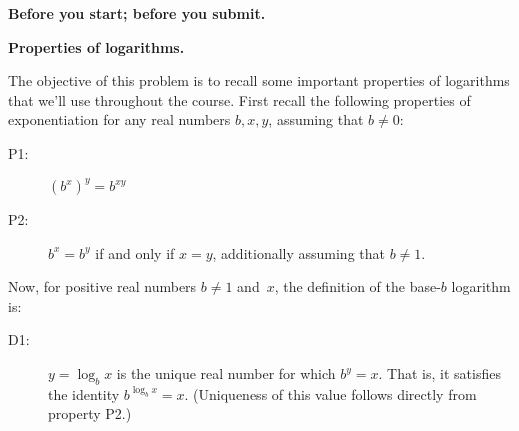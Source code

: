 \documentclass[11pt,addpoints]{exam}
\begin{document}
\hwpreface

\pointsinmargin
{}
\marginpointname{ \points}
\marginbonuspointname{ \bonuspoints}

\begin{questions}

  \addtocounter{question}{-1}
  \question[0] \textbf{Before you start; before you submit.}
  

  \question \textbf{Properties of logarithms.}
  
  The objective of this problem is to recall some important properties of logarithms that we'll use throughout the course.
  First recall the following properties of exponentiation for any real numbers $b, x, y$, assuming that $b \neq 0$:
  \begin{description}
  \item[P1:] $(b^x)^y = b^{xy}$
  \item[P2:] $b^x = b^y$ if and only if $x = y$, additionally assuming that $b \neq 1$.
  \end{description}

  Now, for positive real numbers $b \neq 1$ and~$x$, the definition of the base-$b$ logarithm is:
  \begin{description}
  \item[D1:] $y = \log_b x$ is the unique real number for which $b^y = x$.
    That is, it satisfies the identity $b^{\log_{b} x} = x$.
    (Uniqueness of this value follows directly from property P2.)
  \end{description}
  

\end{questions}
\end{document}
